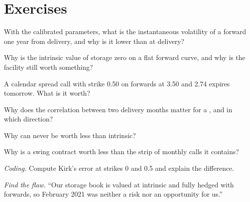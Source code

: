 \section{Exercises}

\begin{exercise}[$\star$]\label{exo:rc:commodity-and-energy-derivatives:1}
With the calibrated parameters, what is the instantaneous volatility of a forward one year
from delivery, and why is it lower than at delivery?
\end{exercise}

\begin{exercise}[$\star$]\label{exo:rc:commodity-and-energy-derivatives:2}
Why is the intrinsic value of storage zero on a flat forward curve, and why is the
facility still worth something?
\end{exercise}

\begin{exercise}[$\star$]\label{exo:rc:commodity-and-energy-derivatives:3}
A calendar spread call with strike 0.50 on forwards at 3.50 and 2.74 expires tomorrow.
What is it worth?
\end{exercise}

\begin{exercise}[$\star\star$]\label{exo:rc:commodity-and-energy-derivatives:4}
Why does the correlation between two delivery months matter for a , and in
which direction?
\end{exercise}

\begin{exercise}[$\star\star$]\label{exo:rc:commodity-and-energy-derivatives:5}
Why can  never be worth less than intrinsic?
\end{exercise}

\begin{exercise}[$\star\star$]\label{exo:rc:commodity-and-energy-derivatives:6}
Why is a swing contract worth less than the strip of monthly calls it contains?
\end{exercise}

\begin{exercise}[$\star\star\star$]\label{exo:rc:commodity-and-energy-derivatives:7}
\emph{Coding.} Compute Kirk's error at strikes 0 and 0.5 and explain the difference.
\end{exercise}

\begin{exercise}[$\star\star\star$]\label{exo:rc:commodity-and-energy-derivatives:8}
\emph{Find the flaw.} ``Our storage book is valued at intrinsic and fully hedged with
forwards, so February 2021 was neither a risk nor an opportunity for us.''
\end{exercise}


